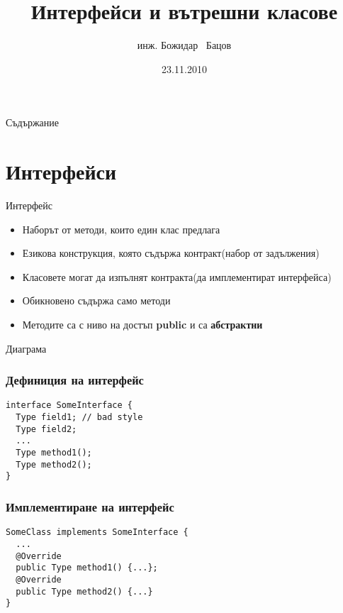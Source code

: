 \documentclass{beamer}
\title{Интерфейси и вътрешни класове}
\author{инж. Божидар ~Бацов}
\institute{Drow Ltd.}
\date{23.11.2010}
\begin{document}
\begin{frame}
  \titlepage
\end{frame}

\begin{frame}{Съдържание}
  \tableofcontents[pausesections]
\end{frame}

\section{Интерфейси}

\begin{frame}{Интерфейс}
  \begin{itemize}
  \item
    Наборът от методи, които един клас предлага
  \item
    Езикова конструкция, която съдържа контракт(набор
    от задължения)
  \item Класовете могат да изпълнят контракта(да имплементират
    интерфейса)
  \item Обикновено съдържа само методи
  \item Методите са с ниво на достъп \textbf{public} и са \textbf{абстрактни}
  \end{itemize}
\end{frame}

\begin{frame}{Диаграма}
  \transdissolve
  
\end{frame}

\begin{frame}[fragile]
  \frametitle{Дефиниция на интерфейс}
  \transdissolve
\begin{lstlisting}
interface SomeInterface {
  Type field1; // bad style
  Type field2;
  ...
  Type method1();
  Type method2();
}
\end{lstlisting}
\end{frame}

\begin{frame}[fragile]
  \frametitle{Имплементиране на интерфейс}
  \transdissolve
\begin{lstlisting}
SomeClass implements SomeInterface {
  ...  
  @Override
  public Type method1() {...};
  @Override
  public Type method2() {...}
}
\end{lstlisting}
\end{frame}
\end{document}
